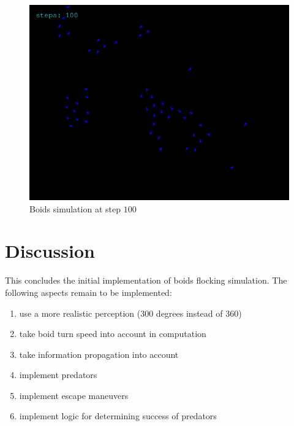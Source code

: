 \documentclass[9pt]{pnas-new}
\begin{document}
\begin{figure}[h]
	\centering
	\includegraphics[width=0.8\linewidth]{boids_step_100.jpg}
	\caption{Boids simulation at step $100$}
\end{figure}

\newpage

\section*{Discussion}
This concludes the initial implementation of boids flocking simulation.
The following aspects remain to be implemented:
\begin{enumerate}
	\item use a more realistic perception (300 degrees instead of 360)
	\item take boid turn speed into account in computation
	\item take information propagation into account
	\item implement predators
	\item implement escape maneuvers
	\item implement logic for determining success of predators
\end{enumerate}


\showacknow %


\begin{multicols}{2}
	\section*{\bibname}
	
\end{multicols}
\end{document}
